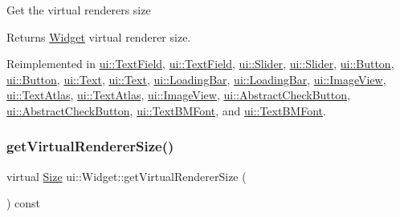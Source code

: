 Get the virtual renderer\textquotesingle{}s size \begin{DoxyReturn}{Returns}
\hyperlink{classui_1_1Widget}{Widget} virtual renderer size. 
\end{DoxyReturn}


Reimplemented in \hyperlink{classui_1_1TextField_a1eb2eb5212ee89b2f54dad80bd9a22ca}{ui\+::\+Text\+Field}, \hyperlink{classui_1_1TextField_a1ca24c7493ae07def476b7715f668390}{ui\+::\+Text\+Field}, \hyperlink{classui_1_1Slider_ab49069835dfbf66b2e5a2e6c99050bf6}{ui\+::\+Slider}, \hyperlink{classui_1_1Slider_a70a4f1507c4a95f317368512098959da}{ui\+::\+Slider}, \hyperlink{classui_1_1Button_a098e64c65b080b1333cdefc5cd24201d}{ui\+::\+Button}, \hyperlink{classui_1_1Button_aaae39c5dc7a9e11c1b68d4b0f3b7dcb0}{ui\+::\+Button}, \hyperlink{classui_1_1Text_a1a610c3ab53ff659e0f1b9071245bbc1}{ui\+::\+Text}, \hyperlink{classui_1_1Text_aabb0e1e54bad95f923c6b8206bf18b5a}{ui\+::\+Text}, \hyperlink{classui_1_1LoadingBar_a7f0a12ed6e25f65890b71d34dd3f3c91}{ui\+::\+Loading\+Bar}, \hyperlink{classui_1_1LoadingBar_a10855c54a44cd470286e3243c1cb58a0}{ui\+::\+Loading\+Bar}, \hyperlink{classui_1_1ImageView_ace03b24b332e54c73f4d36c83afddd3c}{ui\+::\+Image\+View}, \hyperlink{classui_1_1TextAtlas_a844dc4093d63a8ec2d4b6feac6247325}{ui\+::\+Text\+Atlas}, \hyperlink{classui_1_1TextAtlas_a3ec9a3a40ad49b44807ef9e42bc6dd2f}{ui\+::\+Text\+Atlas}, \hyperlink{classui_1_1ImageView_ae146b477fee678c08dfd0875aa0828df}{ui\+::\+Image\+View}, \hyperlink{classui_1_1AbstractCheckButton_a0c3cf028ae6915ee7eb59e287984b0ae}{ui\+::\+Abstract\+Check\+Button}, \hyperlink{classui_1_1AbstractCheckButton_a0ad1948a65d977a254aaf06ca584ad8b}{ui\+::\+Abstract\+Check\+Button}, \hyperlink{classui_1_1TextBMFont_a9ee876578d52a27bc967271ea3fa2b19}{ui\+::\+Text\+B\+M\+Font}, and \hyperlink{classui_1_1TextBMFont_a8fb5c5f091852376a0060487c1981943}{ui\+::\+Text\+B\+M\+Font}.

\mbox{\label{classui_1_1Widget_ae93f34368420f7a664f3cc66d496a21f}} 
\subsubsection{\texorpdfstring{get\+Virtual\+Renderer\+Size()}{getVirtualRendererSize()}\hspace{0.1cm}{\footnotesize\ttfamily [2/2]}}
{\footnotesize\ttfamily virtual \hyperlink{classSize}{Size} ui\+::\+Widget\+::get\+Virtual\+Renderer\+Size (\begin{DoxyParamCaption}{ }\end{DoxyParamCaption}) const\hspace{0.3cm}{\ttfamily [virtual]}}

